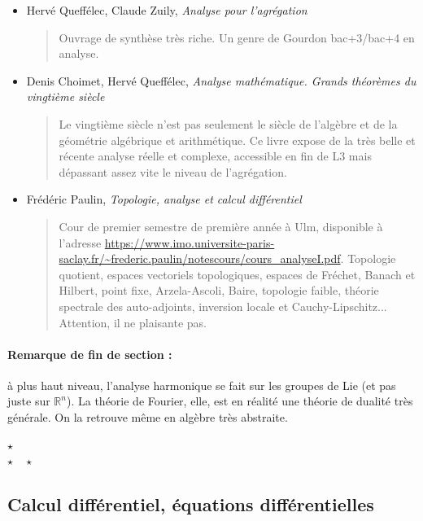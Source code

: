 \documentclass{article}
\def\separateur{\begin{center}
$\star$\\
$\star\quad\star$
\end{center}}
\begin{document}
\begin{itemize}
\item Hervé Queffélec, Claude Zuily, \emph{Analyse pour l'agrégation}
\begin{quote}
Ouvrage de synthèse très riche. Un genre de Gourdon bac+3/bac+4 en analyse.
\end{quote}
\item Denis Choimet, Hervé Queffélec, \emph{Analyse mathématique. Grands théorèmes du vingtième siècle}
\begin{quote}
Le vingtième siècle n'est pas seulement  le siècle de l'algèbre et de la géométrie algébrique et arithmétique. Ce livre expose de la très belle et récente analyse réelle et complexe, accessible en fin de L3 mais dépassant assez vite le niveau de l'agrégation.
\end{quote}
\item Frédéric Paulin, \emph{Topologie, analyse et calcul différentiel}
\begin{quote}
Cour de premier semestre de première année à Ulm, disponible à l'adresse \url{https://www.imo.universite-paris-saclay.fr/~frederic.paulin/notescours/cours_analyseI.pdf}. Topologie quotient, espaces vectoriels topologiques, espaces de Fréchet, Banach et Hilbert, point fixe, Arzela-Ascoli, Baire, topologie faible, théorie spectrale des auto-adjoints, inversion locale et Cauchy-Lipschitz... Attention, il ne plaisante pas. 
\end{quote}
\end{itemize}

\paragraph{Remarque de fin de section : } à plus haut niveau, l'analyse harmonique se fait sur les groupes de Lie (et pas juste sur $\mathbb R^n$). La théorie de Fourier, elle, est en réalité une théorie de dualité très générale. On la retrouve même en algèbre très abstraite.

\separateur
\newpage
\subsection{Calcul différentiel, équations différentielles}
\end{document}
